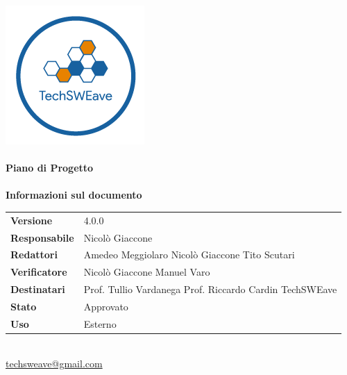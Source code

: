 \documentclass[a4paper]{article}
\begin{document}
\begin{titlepage}
    \begin{center}
        \includegraphics{../../../Images/logo}\\
        \vspace{20px}
        \textcolor{logo}{\hrulefill}\\
        \vspace{20px}
        \textbf{\huge\textcolor{logo}{Piano di Progetto}}\\
        \vspace{10px}
        \textcolor{logo}{\hrulefill}\\
        \vspace{40px}
        \textbf{\Large Informazioni sul documento}\\
        \vspace{20px}
        \begin{tabular}{p{100px} | p{100px}}
            \textbf{Versione}     & 4.0.0                                                                     \\
            \textbf{Responsabile} & Nicolò Giaccone                                                           \\
            \textbf{Redattori}    & Amedeo Meggiolaro \newline Nicolò Giaccone \newline Tito Scutari          \\
            \textbf{Verificatore} & Nicolò Giaccone \newline Manuel Varo                                      \\
            \textbf{Destinatari}  & Prof. Tullio Vardanega \newline Prof. Riccardo Cardin \newline TechSWEave \\
            \textbf{Stato}        & Approvato                                                                 \\
            \textbf{Uso}          & Esterno                                                                   \\
        \end{tabular}\\
        \vspace{60px}
        \href{mailto:techsweave@gmail.com}{techsweave@gmail.com}\\

    \end{center}
\end{titlepage}
\end{document}
